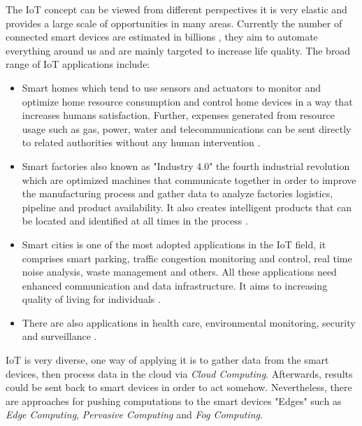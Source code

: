 \noindent The IoT concept can be viewed from different perspectives it is very elastic and provides a large scale of opportunities in many areas. Currently the number of connected smart devices are estimated in billions \cite{connecteddevices}, they aim to automate everything around us and are mainly targeted to increase life quality. The broad range of IoT applications include:
\begin{itemize}
\item Smart homes which tend to use sensors and actuators to monitor and optimize home resource consumption and control home devices in a way that increases humans satisfaction. Further, expenses generated from resource usage such as gas, power, water and telecommunications can be sent directly to related authorities without any human intervention \cite{Chan:2008:RSH:1377032.1377113}.  
\item Smart factories also known as "Industry 4.0" the fourth industrial revolution which are optimized machines that communicate together in order to improve the manufacturing process and gather data to analyze factories logistics, pipeline and product availability. It also creates intelligent products that can be located and identified at all times in the process \cite{Gilchrist:2016:III:2994178}.

\item Smart cities is one of the most adopted applications in the IoT field, it comprises smart parking, traffic congestion monitoring and control, real time noise analysis, waste management and others.  All these applications need enhanced communication and data infrastructure. It aims to increasing quality of living for individuals \cite{6740844}. 

\item There are also applications in  health care, environmental monitoring, security and surveillance \cite{Li:2015:ITS:2750609.2750625}.
\end{itemize}

\noindent IoT is very diverse, one way of applying it is to gather data from the smart devices, then process data in the cloud via \textit{Cloud Computing}. Afterwards, results could be sent back to smart devices in order to act somehow. Nevertheless, there are approaches for pushing computations to the smart devices "Edges"  such as 
\textit{Edge Computing}, \textit{Pervasive Computing} and \textit{Fog Computing}.



